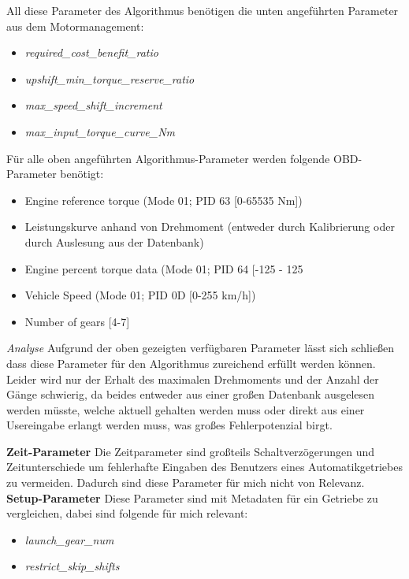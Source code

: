 All diese Parameter des Algorithmus benötigen die unten angeführten Parameter aus dem Motormanagement:
\begin{itemize}
	\item \textit{required_cost_benefit_ratio}
	\cite{Represents the minimum benefit that must be available before a cost based shift will be allowed.}
	\item \textit{upshift_min_torque_reserve_ratio}
	\cite{Specifies the amount of headroom, in terms of full torque, [...] to prevent upshifting too close to full load in a higher gear.}
	\item \textit{max_speed_shift_increment}
	\cite{Determines the number of gears to shift by when upshifting at max_speed_radps. Typically one, though especially for larger amout of gears availible also often 2.}
	\item \textit{max_input_torque_curve_Nm}
	\cite{Used to specify the powertrain torque availible.}
\end{itemize}
Für alle oben angeführten Algorithmus-Parameter werden folgende OBD-Parameter benötigt:
\begin{itemize}
	\item Engine reference torque (Mode 01; PID 63 [0-65535 Nm])
	\item Leistungskurve anhand von Drehmoment (entweder durch Kalibrierung oder durch Auslesung aus der Datenbank)
	\item Engine percent torque data (Mode 01; PID 64 [-125 - 125 %
	\item Vehicle Speed (Mode 01; PID 0D [0-255 km/h])
	\item Number of gears [4-7]
\end{itemize}

\textit{Analyse}
Aufgrund der oben gezeigten verfügbaren Parameter lässt sich schließen dass diese Parameter für den Algorithmus zureichend erfüllt werden können. Leider wird nur der Erhalt des maximalen Drehmoments und der Anzahl der Gänge schwierig, da beides entweder aus einer großen Datenbank ausgelesen werden müsste, welche aktuell gehalten werden muss oder direkt aus einer Usereingabe erlangt werden muss, was großes Fehlerpotenzial birgt. 

\textbf{Zeit-Parameter}
Die Zeitparameter sind großteils Schaltverzögerungen und Zeitunterschiede um fehlerhafte Eingaben des Benutzers eines Automatikgetriebes zu vermeiden. Dadurch sind diese Parameter für mich nicht von Relevanz.
\textbf{Setup-Parameter}
Diese Parameter sind mit Metadaten für ein Getriebe zu vergleichen, dabei sind folgende für mich relevant:
\begin{itemize}
	\item \textit{launch_gear_num}
	\cite{Specifies the normal gear to use when launching from zero speed.}
	\item \textit{restrict_skip_shifts}
	\cite{If set to 'true' forces shifts to be sequential, [...] typically true for transmissions with less than 7 gears.}
\end{itemize}

